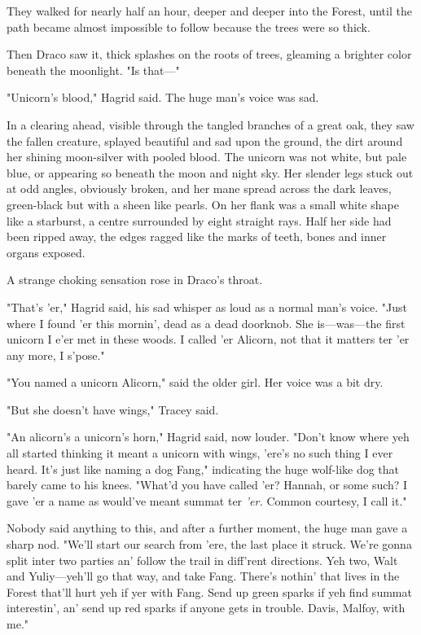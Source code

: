 They walked for nearly half an hour, deeper and deeper into the Forest, until
the path became almost impossible to follow because the trees were so thick.

Then Draco saw it, thick splashes on the roots of trees, gleaming a brighter
color beneath the moonlight. "Is that---"

"Unicorn's blood," Hagrid said. The huge man's voice was sad.

In a clearing ahead, visible through the tangled branches of a great oak, they
saw the fallen creature, splayed beautiful and sad upon the ground, the dirt
around her shining moon-silver with pooled blood. The unicorn was not white,
but pale blue, or appearing so beneath the moon and night sky. Her slender legs
stuck out at odd angles, obviously broken, and her mane spread across the dark
leaves, green-black but with a sheen like pearls. On her flank was a small
white shape like a starburst, a centre surrounded by eight straight rays. Half
her side had been ripped away, the edges ragged like the marks of teeth, bones
and inner organs exposed.

A strange choking sensation rose in Draco's throat.

"That's 'er," Hagrid said, his sad whisper as loud as a normal man's voice.
"Just where I found 'er this mornin', dead as a dead doorknob. She
is---was---the first unicorn I e'er met in these woods. I called 'er Alicorn,
not that it matters ter 'er any more, I s'pose."

"You named a unicorn Alicorn," said the older girl. Her voice was a bit dry.

"But she doesn't have wings," Tracey said.

"An alicorn's a unicorn's horn," Hagrid said, now louder. "Don't know where yeh
all started thinking it meant a unicorn with wings, 'ere's no such thing I ever
heard. It's just like naming a dog Fang," indicating the huge wolf-like dog
that barely came to his knees. "What'd you have called 'er? Hannah, or some
such? I gave 'er a name as would've meant summat ter \emph{'er.} Common
courtesy, I call it."

Nobody said anything to this, and after a further moment, the huge man gave a
sharp nod. "We'll start our search from 'ere, the last place it struck. We're
gonna split inter two parties an' follow the trail in diff'rent directions. Yeh
two, Walt and Yuliy---yeh'll go that way, and take Fang. There's nothin' that
lives in the Forest that'll hurt yeh if yer with Fang. Send up green sparks if
yeh find summat interestin', an' send up red sparks if anyone gets in trouble.
Davis, Malfoy, with me."


